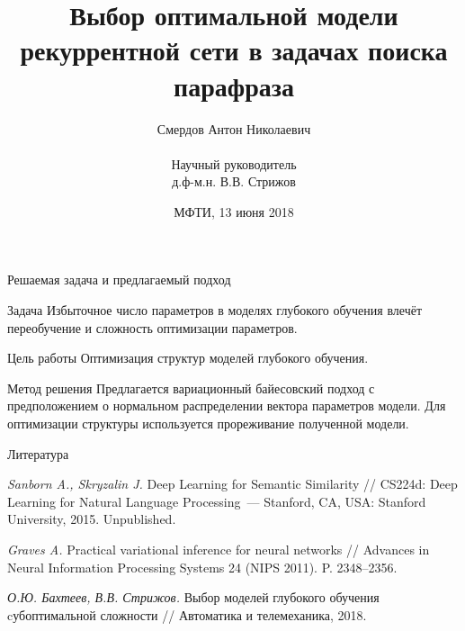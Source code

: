 \documentclass{beamer}
\title[\hbox to 56mm{Выбор оптимальной модели рекуррентной сети\ \  \hfill\insertframenumber\,/\,\inserttotalframenumber}]
{Выбор оптимальной модели рекуррентной сети в задачах поиска парафраза}
\author[А.\,Н. Смердов]{{\large Смердов Антон Николаевич\\~} {\small \\ Научный руководитель \\ д.ф-м.н. В.В. Стрижов}}
\institute[МФТИ]{Московский физико-технический институт \\
	Факультет управления и прикладной математики\\
	Кафедра <<Интеллектуальные системы>>
}
\date{\footnotesize{МФТИ, 13 июня 2018}}
\begin{document}
\begin{frame}
	\titlepage
\end{frame}

\begin{frame}{Решаемая задача и предлагаемый подход}

\begin{block}{Задача}
Избыточное число параметров в моделях глубокого обучения влечёт переобучение и сложность оптимизации параметров.
\end{block}

\begin{block}{Цель работы}
Оптимизация структур моделей глубокого обучения.

\end{block}

\begin{block}{Метод решения}
Предлагается вариационный байесовский подход с предположением о нормальном распределении вектора параметров модели. Для оптимизации структуры используется прореживание полученной модели.

\end{block}

\end{frame}
\begin{frame}{Литература}
%	
	
\begin{thebibliography}{}
	\textit{Sanborn A., Skryzalin J.} 
	Deep Learning for Semantic Similarity // CS224d: Deep Learning for Natural Language Processing~--- Stanford, CA, USA: Stanford University, 2015. Unpublished.
	
	\textit{Graves A.}
	Practical variational inference for neural networks // Advances in Neural Information Processing Systems 24 (NIPS 2011). P. 2348--2356.
	
	\textit{О.Ю. Бахтеев, В.В. Стрижов.}
	Выбор моделей глубокого обучения cубоптимальной сложности // Автоматика и телемеханика, 2018.
\end{thebibliography}{}
	
\end{frame}
\end{document}
